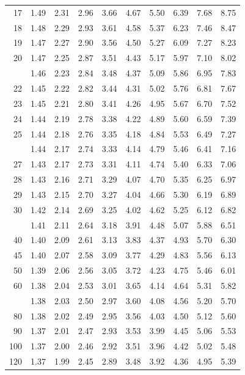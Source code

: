 \documentclass[10pt]{article}
\begin{document}
\begin{longtable}{@{}r!{\vrule width 0.8pt\hspace{0.55em}}rrrrrrrrr@{}}
17 & 1.49 & 2.31 & 2.96 & 3.66 & 4.67 & 5.50 & 6.39 & 7.68 & 8.75 \\
18 & 1.48 & 2.29 & 2.93 & 3.61 & 4.58 & 5.37 & 6.23 & 7.46 & 8.47 \\
19 & 1.47 & 2.27 & 2.90 & 3.56 & 4.50 & 5.27 & 6.09 & 7.27 & 8.23 \\
20 & 1.47 & 2.25 & 2.87 & 3.51 & 4.43 & 5.17 & 5.97 & 7.10 & 8.02 \\
 & 1.46 & 2.23 & 2.84 & 3.48 & 4.37 & 5.09 & 5.86 & 6.95 & 7.83 \\
22 & 1.45 & 2.22 & 2.82 & 3.44 & 4.31 & 5.02 & 5.76 & 6.81 & 7.67 \\
23 & 1.45 & 2.21 & 2.80 & 3.41 & 4.26 & 4.95 & 5.67 & 6.70 & 7.52 \\
24 & 1.44 & 2.19 & 2.78 & 3.38 & 4.22 & 4.89 & 5.60 & 6.59 & 7.39 \\
25 & 1.44 & 2.18 & 2.76 & 3.35 & 4.18 & 4.84 & 5.53 & 6.49 & 7.27 \\
 & 1.44 & 2.17 & 2.74 & 3.33 & 4.14 & 4.79 & 5.46 & 6.41 & 7.16 \\
27 & 1.43 & 2.17 & 2.73 & 3.31 & 4.11 & 4.74 & 5.40 & 6.33 & 7.06 \\
28 & 1.43 & 2.16 & 2.71 & 3.29 & 4.07 & 4.70 & 5.35 & 6.25 & 6.97 \\
29 & 1.43 & 2.15 & 2.70 & 3.27 & 4.04 & 4.66 & 5.30 & 6.19 & 6.89 \\
30 & 1.42 & 2.14 & 2.69 & 3.25 & 4.02 & 4.62 & 5.25 & 6.12 & 6.82 \\
 & 1.41 & 2.11 & 2.64 & 3.18 & 3.91 & 4.48 & 5.07 & 5.88 & 6.51 \\
40 & 1.40 & 2.09 & 2.61 & 3.13 & 3.83 & 4.37 & 4.93 & 5.70 & 6.30 \\
45 & 1.40 & 2.07 & 2.58 & 3.09 & 3.77 & 4.29 & 4.83 & 5.56 & 6.13 \\
50 & 1.39 & 2.06 & 2.56 & 3.05 & 3.72 & 4.23 & 4.75 & 5.46 & 6.01 \\
60 & 1.38 & 2.04 & 2.53 & 3.01 & 3.65 & 4.14 & 4.64 & 5.31 & 5.82 \\
 & 1.38 & 2.03 & 2.50 & 2.97 & 3.60 & 4.08 & 4.56 & 5.20 & 5.70 \\
80 & 1.38 & 2.02 & 2.49 & 2.95 & 3.56 & 4.03 & 4.50 & 5.12 & 5.60 \\
90 & 1.37 & 2.01 & 2.47 & 2.93 & 3.53 & 3.99 & 4.45 & 5.06 & 5.53 \\
100 & 1.37 & 2.00 & 2.46 & 2.92 & 3.51 & 3.96 & 4.42 & 5.02 & 5.48 \\
120 & 1.37 & 1.99 & 2.45 & 2.89 & 3.48 & 3.92 & 4.36 & 4.95 & 5.39 \\

\end{longtable}
\end{document}
